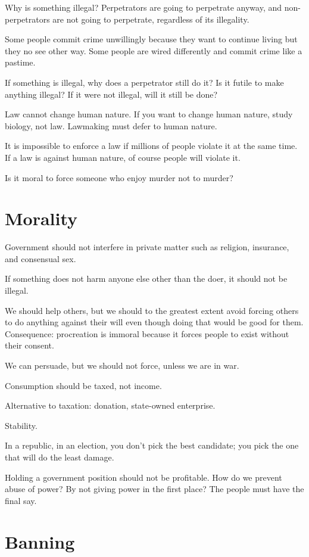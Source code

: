 Why is something illegal?
Perpetrators are going to perpetrate anyway,
and non-perpetrators are not going to perpetrate,
regardless of its illegality.

Some people commit crime unwillingly because they
want to continue living but they no see other way.
Some people are wired differently and commit crime like a pastime.

If something is illegal, why does a perpetrator still do it?
Is it futile to make anything illegal?
If it were not illegal, will it still be done?

Law cannot change human nature.
If you want to change human nature, study biology, not law.
Lawmaking must defer to human nature.

It is impossible to enforce a law if millions of people violate it at the same time.
If a law is against human nature, of course people will violate it.

Is it moral to force someone who enjoy murder not to murder?

\section{Morality}

Government should not interfere in private matter
such as religion, insurance, and consensual sex.

If something does not harm anyone else other than the doer,
it should not be illegal.

We should help others,
but we should to the greatest extent avoid forcing
others to do anything against their will
even though doing that would be good for them.
Consequence: procreation is immoral because
it forces people to exist without their consent.

We can persuade, but we should not force, unless we are in war.

Consumption should be taxed, not income.

Alternative to taxation: donation, state-owned enterprise.

Stability.

In a republic, in an election, you don't pick the best candidate;
you pick the one that will do the least damage.

Holding a government position should not be profitable.
How do we prevent abuse of power?
By not giving power in the first place?
The people must have the final say.

\section{Banning}

